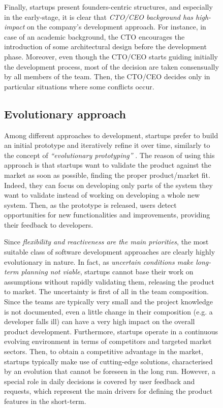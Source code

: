 \documentclass[12pt,journal,compsoc]{../sty/IEEEtran}
\begin{document}
\begin{table}[!t]
\begin{figure}[!t]
Finally, startups present founders-centric structures, and especially in the
early-stage, it is clear that \textit{CTO/CEO background has high-impact} on the
company's development approach. For instance, in case of an academic background,
the CTO encourages the introduction of some architectural design before the
development phase. Moreover, even though the CTO/CEO starts guiding initially
the development process, most of the decision are taken consensually by all
members of the team. Then, the CTO/CEO decides only in particular situations
where some conflicts occur.
\subsection{Evolutionary approach} \label{res:gsm:cat2} Among different
approaches to development, startups prefer to build an initial  prototype and
iteratively refine it over time, similarly to the concept of
\textit{``evolutionary prototyping''} \cite{EvProt}. The reason of using this
approach is that startups want to validate the product against the market as
soon as possible, finding the proper product/market fit. Indeed, they can focus
on developing only parts of the system they want to validate instead of working
on developing a whole new system. Then, as the prototype is released, users
detect opportunities for new functionalities and improvements, providing their
feedback to developers.


Since \textit{flexibility and reactiveness are the main priorities}, the most
suitable class of software development approaches are clearly highly
evolutionary in nature. In fact, as \textit{uncertain conditions make long-term
planning not viable}, startups cannot base their work on assumptions without
rapidly validating them, releasing the product to market. The uncertainty is
first of all in the team composition. Since the teams are typically very small
and the project knowledge is not documented, even a little change in their
composition (e.g. a developer falls ill) can have a very high impact on the
overall product development. Furthermore, startups operate in a continuous
evolving environment in terms of competitors and targeted market sectors. Then,
to obtain a competitive advantage in the market, startups typically make use of
cutting-edge solutions, characterised by an evolution that cannot be foreseen in
the long run. However, a special role in daily decisions is covered by user
feedback and requests, which represent the main drivers for defining the product
features in the short-term.


\end{figure}
\end{table}
\end{document}
